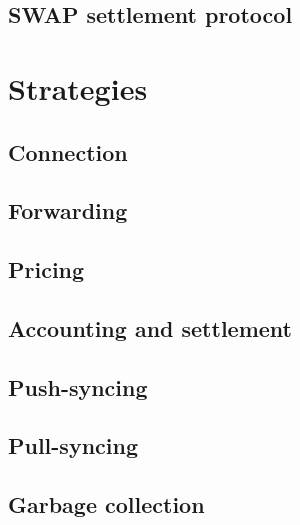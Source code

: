 \section{SWAP settlement protocol \statusorange}\label{spec:protocol:swap}


\chapter{Strategies \statusorange}\label{spec:strategy}

\section{Connection  \statusorange}\label{spec:strategy:connection}
%

\section{Forwarding  \statusorange}\label{spec:strategy:forwarding}


\section{Pricing  \statusorange}\label{spec:strategy:pricing}


\section{Accounting and settlement  \statusorange}\label{spec:strategy:swap}


\section{Push-syncing  \statusorange}\label{spec:strategy:push-sync}


\section{Pull-syncing  \statusorange}\label{spec:strategy:pull-sync}


\section{Garbage collection \statusorange}\label{spec:strategy:garbage-collection}


